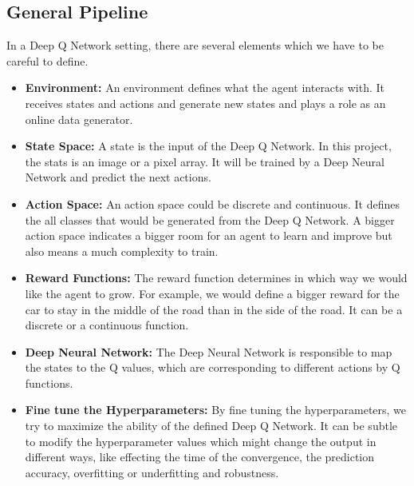 \subsection{General Pipeline}

In a Deep Q Network setting, there are several elements which we have to be careful to define.

\begin{itemize}
	
    \item \textbf{Environment:} An environment defines what the agent interacts with. It receives states and actions and generate new states and plays a role as an online data generator. 
    \item \textbf{State Space:} A state is the input of the Deep Q Network. In this project, the stats is an image or a pixel array. It will be trained by a Deep Neural Network and predict the next actions.
    \item \textbf{Action Space:} An action space could be discrete and continuous. It defines the all classes that would be generated from the Deep Q Network. A bigger action space indicates a bigger room for an agent to learn and improve but also means a much complexity to train.
    \item \textbf{Reward Functions:} The reward function determines in which way we would like the agent to grow. For example, we would define a bigger reward for the car to stay in the middle of the road than in the side of the road. It can be a discrete or a continuous function.
    \item \textbf{Deep Neural Network:} The Deep Neural Network is responsible to map the states to the Q values, which are corresponding to different actions by Q functions. 
    \item \textbf{Fine tune the Hyperparameters:} By fine tuning the hyperparameters, we try to maximize the ability of the defined Deep Q Network. It can be subtle to modify the hyperparameter values which might change the output in different ways, like effecting the time of the convergence, the prediction accuracy, overfitting or underfitting and robustness.
    
\end{itemize}







